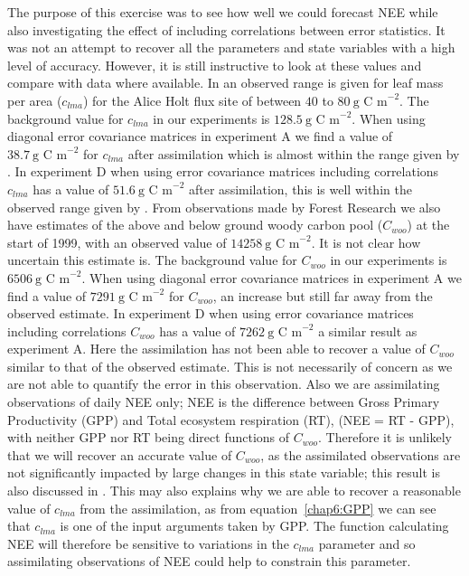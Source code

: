 The purpose of this exercise was to see how well we could forecast NEE while also investigating the effect of including correlations between error statistics. It was not an attempt to recover all the parameters and state variables with a high level of accuracy. However, it is still instructive to look at these values and compare with data where available. In \citet{meir2002acclimation} an observed range is given for leaf mass per area ($c_{lma}$) for the Alice Holt flux site of between $40$ to $80 ~\text{g C m}^{-2}$. The background value for $c_{lma}$ in our experiments is $128.5 ~\text{g C m}^{-2}$. When using diagonal error covariance matrices in experiment A we find a value of $38.7~\text{g C m}^{-2}$ for $c_{lma}$ after assimilation which is almost within the range given by \citet{meir2002acclimation}. In experiment D when using error covariance matrices including correlations $c_{lma}$ has a value of $51.6~\text{g C m}^{-2}$ after assimilation, this is well within the observed range given by \citet{meir2002acclimation}. From observations made by Forest Research we also have estimates of the above and below ground woody carbon pool ($C_{woo}$) at the start of 1999, with an observed value of $14258~\text{g C m}^{-2}$. It is not clear how uncertain this estimate is. The background value for $C_{woo}$ in our experiments is $6506~\text{g C m}^{-2}$. When using diagonal error covariance matrices in experiment A we find a value of $7291~\text{g C m}^{-2}$ for $C_{woo}$, an increase but still far away from the observed estimate. In experiment D when using error covariance matrices including correlations $C_{woo}$ has a value of $7262~\text{g C m}^{-2}$ a similar result as experiment A. Here the assimilation has not been able to recover a value of $C_{woo}$ similar to that of the observed estimate. This is not necessarily of concern as we are not able to quantify the error in this observation. Also we are assimilating observations of daily NEE only; NEE is the difference between Gross Primary Productivity (GPP) and Total ecosystem respiration (RT), (NEE = RT - GPP), with neither GPP nor RT being direct functions of $C_{woo}$. Therefore it is unlikely that we will recover an accurate value of $C_{woo}$, as the assimilated observations are not significantly impacted by large changes in this state variable; this result is also discussed in \citet{fox2009reflex}. This may also explains why we are able to recover a reasonable value of $c_{lma}$ from the assimilation, as from equation~\eqref{chap6:GPP} we can see that $c_{lma}$ is one of the input arguments taken by GPP. The function calculating NEE will therefore be sensitive to variations in the $c_{lma}$ parameter and so assimilating observations of NEE could help to constrain this parameter.

